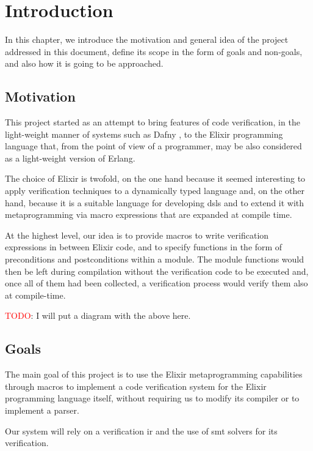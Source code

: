 \chapter{Introduction}
\label{cap:introduction}

In this chapter, we introduce the motivation and general idea of the project
addressed in this document, define its scope in the form of goals and non-goals,
and also how it is going to be approached.

\section{Motivation}

This project started as an attempt to bring features of code verification, in
the light-weight manner of systems such as Dafny \citep{DafnyManual}, to the
Elixir programming language that, from the point of view of a programmer, may be
also considered as a light-weight version of Erlang.

The choice of Elixir is twofold, on the one hand because it seemed interesting 
to apply verification techniques to a dynamically typed language and, on the
other hand, because it is a suitable language for developing \gls{dsl}s and to 
extend it with metaprogramming via macro expressions that are expanded at
compile time.

At the highest level, our idea is to provide macros to write verification 
expressions in between Elixir code, and to specify functions in the form of
preconditions and postconditions within a module. The module functions would
then be left during compilation without the verification code to be executed
and, once all of them had been collected, a verification process would verify
them also at compile-time.

\textcolor{red}{TODO}: I will put a diagram with the above here.

\section{Goals}

The main goal of this project is to use the Elixir metaprogramming capabilities
through macros to implement a code verification system for the Elixir
programming language itself, without requiring us to modify its compiler or to
implement a parser.

Our system will rely on a verification \gls{ir} and the use of \acrshort{smt}
solvers for its verification.

